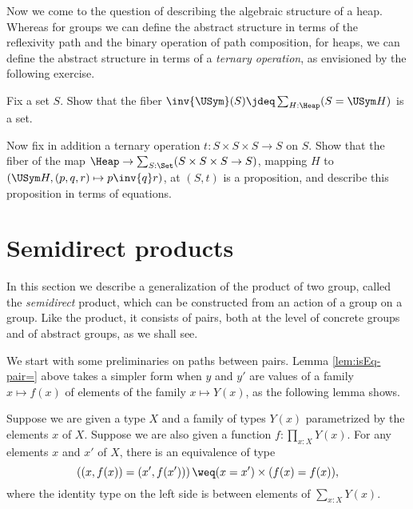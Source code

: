 Now we come to the question of describing the algebraic structure
of a heap.
Whereas for groups we can define the abstract structure
in terms of the reflexivity path and the binary operation of path composition,
for heaps, we can define the abstract structure
in terms of a \emph{ternary operation},
as envisioned by the following exercise.

\begin{exercise}\label{xca:heap-variety}
  Fix a set $S$.
  Show that the fiber $\inv{\USym}(S)\jdeq\sum_{H:\Heap}(S=\USym H)$ is a set.

  Now fix in addition a ternary operation $t:S\times S\times S\to S$ on $S$.
  Show that the fiber of the map $\Heap \to \sum_{S:\Set}(S\times S\times S \to S)$,
  mapping $H$ to $(\USym H,(p,q,r)\mapsto p \inv{q} r)$,
  at $(S,t)$ is a proposition,
  and describe this proposition in terms of equations.
\end{exercise}

\section{Semidirect products}
\label{sec:Semidirect-products}

In this section we describe a generalization of the product of two group, called the {\em semidirect} product, which can be constructed from an
action of a group on a group.  Like the product, it consists of pairs, both at the level of concrete groups and of abstract groups, as we shall
see.

We start with some preliminaries on paths between pairs.
Lemma \cref{lem:isEq-pair=} above takes a simpler form when $y$ and $y'$ are values of a family $x \mapsto f(x)$
of elements of the family $x \mapsto Y(x)$, as the following lemma shows.

\begin{lemma}\label{lem:pathpairsection}
  Suppose we are given a type $X$ and a family of types $Y(x)$ parametrized by the elements $x$ of $X$.
  Suppose we are also given a function $f : \prod_{x:X} Y(x)$.
  For any elements $x$ and $x'$ of $X$,
  there is an equivalence of type
  $$\left ( (x,f(x)) = (x',f(x')) \right ) \weq (x=x') \times (f(x) = f(x)),$$
  where the identity type on the left side is between elements of $\sum_{x:X} Y(x)$.
\end{lemma}

